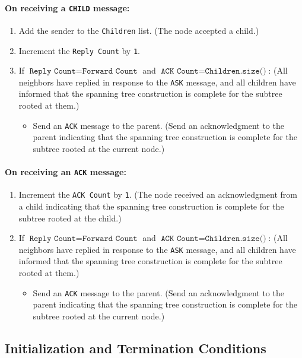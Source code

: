 \paragraph{On receiving a \texttt{CHILD} message:}
\begin{enumerate}
    \item Add the sender to the \texttt{Children} list. (The node accepted a child.)
    \item Increment the \texttt{Reply Count} by \texttt{1}.
    \item If \(\texttt{Reply Count} = \texttt{Forward Count}\) and \(\texttt{ACK Count} = \texttt{Children.size()}\): (All neighbors have replied in response to the \texttt{ASK} message, and all children have informed that the spanning tree construction is complete for the subtree rooted at them.)
    \begin{itemize}
        \item Send an \texttt{ACK} message to the parent. (Send an acknowledgment to the parent indicating that the spanning tree construction is complete for the subtree rooted at the current node.)
    \end{itemize}
\end{enumerate}

\paragraph{On receiving an \texttt{ACK} message:}
\begin{enumerate}
    \item Increment the \texttt{ACK Count} by \texttt{1}. (The node received an acknowledgment from a child indicating that the spanning tree construction is complete for the subtree rooted at the child.)
    \item If \(\texttt{Reply Count} = \texttt{Forward Count}\) and \(\texttt{ACK Count} = \texttt{Children.size()}\): (All neighbors have replied in response to the \texttt{ASK} message, and all children have informed that the spanning tree construction is complete for the subtree rooted at them.)
    \begin{itemize}
        \item Send an \texttt{ACK} message to the parent. (Send an acknowledgment to the parent indicating that the spanning tree construction is complete for the subtree rooted at the current node.)
    \end{itemize}
\end{enumerate}

\subsection{Initialization and Termination Conditions}

